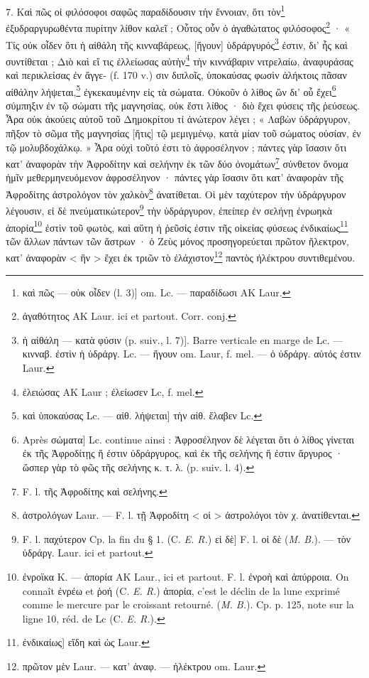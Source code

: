 \documentclass[landscape, a4paper, 11pt, oneside, polutonikogreek, french]{article}
\begin{document}
7. Καὶ πῶς οἱ φιλόσοφοι σαφῶς παραδίδουσιν τὴν ἔννοιαν, ὅτι τὸν\footnote{καὶ πῶς --- οὐκ οἶδεν (l. 3)] om. Lc. --- παραδίδωσι AK Laur.} ἐξυδραργυρωθέντα πυρίτην λίθον καλεῖ ; Οὗτος οὖν ὁ ἀγαθώτατος φιλόσοφος\footnote{ἀγαθότητος AK Laur. ici et partout. Corr. conj.} · « Τίς οὐκ οἶδεν ὅτι ἡ αἰθάλη τῆς κινναβάρεως, [ἤγουν] ὑδράργυρός\footnote{ἡ αἰθάλη --- κατὰ φύσιν (p. suiv., l. 7)]. Barre verticale en marge de Lc. --- κινναβ. ἐστὶν ἡ ὐδράργ. Lc. --- ἤγουν om. Laur, f. mel. --- ὁ ὑδράργ. αὐτός ἐστιν Laur.} ἐστιν, δι' ἧς καὶ συντίθεται ; Διὸ καὶ εἴ τις ἐλλείωσας αὐτὴν\footnote{ἐλειώσας AK Laur ; ἐλείωσεν Lc, f. mel.} τὴν κιννάβαριν νιτρελαίω, ἀναφυράσας καὶ περικλείσας ἐν ἄγγε- (f. 170 v.) σιν διπλοῖς, ὑποκαύσας φωσὶν ἀλήκτοις πᾶσαν αἰθάλην λήψεται,\footnote{καὶ ὑποκαύσας Lc. --- αἰθ. λήψεται] τὴν αἰθ. ἔλαβεν Lc.} ἐγκεκαυμένην εἰς τὰ σώματα. Οὐκοῦν ὁ λίθος ὢν δι' οὗ ἔχει\footnote{Après σώματα] Lc. continue ainsi : Ἀφροσέληνον δὲ λέγεται ὅτι ὁ λίθος γίνεται ἐκ τῆς Ἀφροδίτῃς ἥ ἐστιν ὑδράργυρος, καὶ ἐκ τῆς σελήνης ἥ ἐστιν ἄργυρος · ὥσπερ γὰρ τὸ φῶς τῆς σελήνης κ. τ. λ. (p. suiv. l. 4).} σύμπηξιν ἐν τῷ σώματι τῆς μαγνησίας, οὐκ ἔστι λίθος · διὸ ἔχει φύσεις τῆς ῥεύσεως. Ἆρα οὐκ ἀκούεις αὐτοῦ τοῦ Δημοκρίτου τί ἀνώτερον λέγει ; « Λαβὼν ὑδράργυρον, πῆξον τὸ σῶμα τῆς μαγνησίας [ἥτις] τῷ μεμιγμένῳ, κατὰ μίαν τοῦ σώματος οὐσίαν, ἐν τῷ μολυβδοχάλκῳ. » Ἆρα οὐχὶ τοῦτό ἐστι τὸ ἀφροσέληνον ; πάντες γὰρ ἴσασιν ὅτι κατ' ἀναφορὰν τὴν Ἀφροδίτην καὶ σελήνην ἐκ τῶν δύο ὀνομάτων\footnote{F. l. τῆς Ἀφροδίτης καὶ σελήνης.} σύνθετον ὄνομα ἡμῖν μεθερμηνευόμενον ἀφροσέληνον · πάντες γὰρ ἴσασιν ὅτι κατ' ἀναφορὰν τῆς Ἀφροδίτης ἀστρολόγον τὸν χαλκὸν\footnote{ἀστρολόγων Laur. --- F. l. τῇ Ἀφροδίτη < οἱ > ἀστρολόγοι τὸν χ. ἀνατίθενται.} ἀνατίθεται. Οἱ μὲν ταχύτερον τὴν ὑδράργυρον λέγουσιν, εἰ δὲ πνεύματικώτερον\footnote{F. l. παχύτερον Cp. la fin du § 1. (C. \emph{E. R.}) εἰ δὲ] F. l. οἱ δὲ (\emph{M. B.}). --- τὸν ὑδράργ. Laur. ici et partout.} τὴν ὑδράργυρον, ἐπείπερ ἐν σελήνῃ ἐνρωηκὰ ἀπορία\footnote{ἐνροϊκα K. --- ἀπορία AK Laur., ici et partout. F. l. ἐνροὴ καὶ ἀπύρροια. On connaît ἐνρέω et ῥοή (C. \emph{E. R.}) ἀπορία, c'est le déclin de la lune exprimé comme le mercure par le croissant retourné. (\emph{M. B.}). Cp. p. 125, note sur la ligne 10, réd. de Lc (C. \emph{E. R.}).} ἐστὶν τοῦ φωτὸς, καὶ αὕτη ἡ ῥεῦσίς ἐστιν τῆς οἰκείας φύσεως ἐνδικαίως\footnote{ἐνδικαίως] εἴδη καὶ ὡς Laur.} τῶν ἄλλων πάντων τῶν ἄστρων · ὁ Ζεὺς μόνος προσηγορεύεται πρῶτον ἤλεκτρον, κατ' ἀναφορὰν < ἣν > ἔχει ἐκ τριῶν τὸ ἐλάχιστον\footnote{πρῶτον μὲν Laur. --- κατ' ἀναφ. --- ἠλέκτρου om. Laur.} παντὸς ἠλέκτρου συντιθεμένου.
\end{document}
